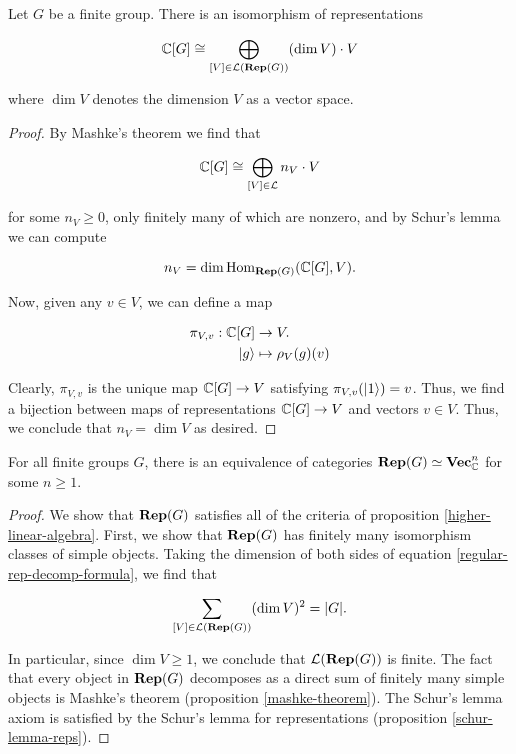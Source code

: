 \begin{lem}\label{regular-rep-decomp} Let $G$ be a finite group. There is an isomorphism of representations

\begin{equation}\label{regular-rep-decomp-formula}
{\mathbb C}[G]\cong \bigoplus_{[V]\in {\mathcal L}({\bf Rep}(G))}(\dim V)\cdot V
\end{equation}

where $\dim V$ denotes the dimension $V$ as a vector space.
\end{lem}
\begin{proof} By Mashke's theorem we find that

$${\mathbb C}[G]\cong \bigoplus_{[V]\in {\mathcal L}}n_V \cdot V$$

for some $n_V\geq 0$, only finitely many of which are nonzero, and by Schur's lemma we can compute

$$n_V=\dim \operatorname{Hom}_{{\bf Rep}(G)}({\mathbb C}[G],V).$$

Now, given any $v\in V$, we can define a map

\begin{align*}
\pi_{V,v}:{\mathbb C}[G]&\to V.\\
\ket{g}&\mapsto \rho_V(g)(v)
\end{align*}

Clearly, $\pi_{V,v}$ is the unique map ${\mathbb C}[G]\to V$ satisfying $\pi_{V,v}(\ket{1})=v$. Thus, we find a bijection between maps of representations ${\mathbb C}[G]\to V$ and vectors $v\in V$. Thus, we conclude that $n_V=\dim V$ as desired.

\end{proof}

\begin{cor} For all finite groups $G$, there is an equivalence of categories ${\bf Rep}(G)\simeq  {\bf Vec}_{{\mathbb C}}^n$ for some $n\geq 1$.
\end{cor}
\begin{proof}We show that ${\bf Rep}(G)$ satisfies all of the criteria of proposition \ref{higher-linear-algebra}. First, we show that ${\bf Rep}(G)$ has finitely many isomorphism classes of simple objects. Taking the dimension of both sides of equation \ref{regular-rep-decomp-formula}, we find that

$$\sum_{[V]\in {\mathcal L}({\bf Rep}(G))}(\dim V)^2=|G|.$$

In particular, since $\dim V\geq 1$, we conclude that ${\mathcal L}({\bf Rep}(G))$ is finite. The fact that every object in ${\bf Rep}(G)$ decomposes as a direct sum of finitely many simple objects is Mashke's theorem (proposition \ref{mashke-theorem}). The Schur's lemma axiom is satisfied by the Schur's lemma for representations (proposition \ref{schur-lemma-reps}).
\end{proof}

